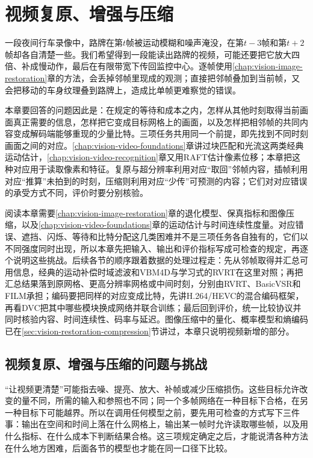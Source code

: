 \chapter{视频复原、增强与压缩}
\label{chap:vision-video-restoration}

一段夜间行车录像中，路牌在第$t$帧被运动模糊和噪声淹没，在第$t-3$帧和第$t+2$帧却各自清楚一些。我们希望得到一段能读出路牌的视频，可能还要把它放大四倍、补成慢动作，最后在有限带宽下传回监控中心。逐帧使用\ref{chap:vision-image-restoration}章的方法，会丢掉邻帧里现成的观测；直接把邻帧叠加到当前帧，又会把移动的车身纹理叠到路牌上，造成比单帧更难察觉的错误。

本章要回答的问题因此是：在规定的等待和成本之内，怎样从其他时刻取得当前画面真正需要的信息，怎样把它变成目标网格上的画面，以及怎样把相邻帧的共同内容变成解码端能够重现的少量比特。三项任务共用同一个前提，即先找到不同时刻画面之间的对应。\ref{chap:vision-video-foundations}章讲过块匹配和光流这两类经典运动估计，\ref{chap:vision-video-recognition}章又用RAFT估计像素位移；本章把这种对应用于读取像素和特征。复原与超分辨率利用对应“取回”邻帧内容，插帧利用对应“推算”未拍到的时刻，压缩则利用对应“少传”可预测的内容；它们对对应错误的承受方式不同，评价时要分别核验。

阅读本章需要\ref{chap:vision-image-restoration}章的退化模型、保真指标和图像压缩，以及\ref{chap:vision-video-foundations}章的运动估计与时间连续性度量。对应错误、遮挡、闪烁、等待和比特分配这几类困难并不是三项任务各自独有的，它们以不同强度同时出现，所以本章先把输入、输出和评价指标写成可检查的规定，再逐个说明这些挑战。后续各节的顺序跟着数据的处理过程走：先从邻帧取得并汇总可用信息，经典的运动补偿时域滤波和VBM4D与学习式的RVRT在这里对照；再把汇总结果落到原网格、更高分辨率网格或中间时刻，分别由RVRT、BasicVSR和FILM承担；编码要把同样的对应变成比特，先讲H.264/HEVC的混合编码框架，再看DVC把其中哪些模块换成网络并联合训练；最后回到评价，统一比较协议并同时核验内容、时间连续性、码率与延迟。图像压缩中的量化、概率模型和熵编码已在\ref{sec:vision-restoration-compression}节讲过，本章只说明视频新增的部分。

\section{视频复原、增强与压缩的问题与挑战}
\label{sec:vision-video-restoration-challenges}
\label{sec:vision-video-restoration-goals}

“让视频更清楚”可能指去噪、提亮、放大、补帧或减少压缩损伤。这些目标允许改变的量不同，所需的输入和参照也不同；同一个多帧网络在一种目标下合格，在另一种目标下可能越界。所以在调用任何模型之前，要先用可检查的方式写下三件事：输出在空间和时间上落在什么网格上，输出某一帧时允许读取哪些帧，以及用什么指标、在什么成本下判断结果合格。这三项规定确定之后，才能说清各种方法在什么地方困难，后面各节的模型也才能在同一口径下比较。

